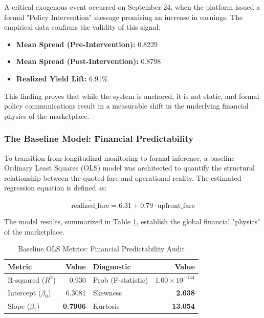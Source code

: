 A critical exogenous event occurred on September 24, when the platform issued a formal "Policy Intervention" message promising an increase in earnings. The empirical data confirms the validity of this signal:
\begin{itemize}
    \item \textbf{Mean Spread (Pre-Intervention):} 0.8229
    \item \textbf{Mean Spread (Post-Intervention):} 0.8798
    \item \textbf{Realized Yield Lift:} 6.91\%
\end{itemize}

This finding proves that while the system is anchored, it is not static, and formal policy communications result in a measurable shift in the underlying financial physics of the marketplace.


\subsubsection*{The Baseline Model: Financial Predictability}

To transition from longitudinal monitoring to formal inference, a baseline Ordinary Least Squares (OLS) model was architected to quantify the structural relationship between the quoted fare and operational reality. The estimated regression equation is defined as:

\begin{equation}
    \widehat{\text{realized\_fare}} = 6.31 + 0.79 \cdot \text{upfront\_fare}
\end{equation}

The model results, summarized in Table \ref{tab:ols_baseline}, establish the global financial "physics" of the marketplace.

\begin{table}[H]
    \centering
    \caption{Baseline OLS Metrics: Financial Predictability Audit}
    \label{tab:ols_baseline}
    \begin{tabularx}{\textwidth}{X r | X r}
        \toprule
        \textbf{Metric} & \textbf{Value} & \textbf{Diagnostic} & \textbf{Value} \\
        \midrule
        R-squared ($R^2$) & 0.930 & Prob (F-statistic) & $1.00 \times 10^{-144}$ \\
        Intercept ($\beta_0$) & 6.3081 & Skewness & \textbf{2.638} \\
        Slope ($\beta_1$) & \textbf{0.7906} & Kurtosis & \textbf{13.054} \\
        \bottomrule
    \end{tabularx}
\end{table}

